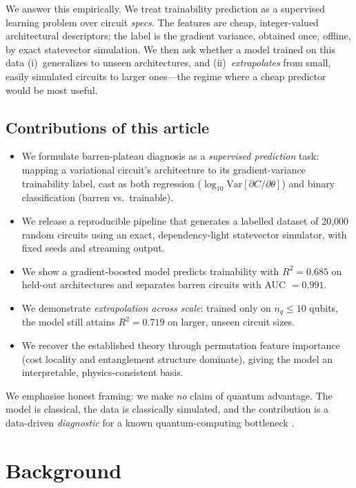 \documentclass[journal]{IEEEtran}
\newcommand{\Nrows}{20{,}000}                 %
\newcommand{\RsqHold}{0.685}
\newcommand{\AucHold}{0.991}
\newcommand{\ExtrapCut}{10}
\newcommand{\RsqExtrap}{0.719}
\begin{document}
We answer this empirically. We treat trainability prediction as a supervised
learning problem over circuit \emph{specs}. The features are cheap, integer-valued
architectural descriptors; the label is the gradient variance, obtained once,
offline, by exact statevector simulation. We then ask whether a model trained on
this data (i)~generalizes to unseen architectures, and (ii)~\emph{extrapolates}
from small, easily simulated circuits to larger ones---the regime where a cheap
predictor would be most useful.

\subsection*{Contributions of this article}
\begin{itemize}
\item We formulate barren-plateau diagnosis as a \emph{supervised prediction}
task: mapping a variational circuit's architecture to its gradient-variance
trainability label, cast as both regression ($\log_{10}\mathrm{Var}[\partial
C/\partial\theta]$) and binary classification (barren vs.\ trainable).
\item We release a reproducible pipeline that generates a labelled dataset of
\Nrows{} random circuits using an exact, dependency-light statevector simulator,
with fixed seeds and streaming output.
\item We show a gradient-boosted model predicts trainability with $R^2=\RsqHold{}$
on held-out architectures and separates barren circuits with AUC $=\AucHold{}$.
\item We demonstrate \emph{extrapolation across scale}: trained only on
$n_q\le\ExtrapCut{}$ qubits, the model still attains $R^2=\RsqExtrap{}$ on larger,
unseen circuit sizes.
\item We recover the established theory through permutation feature importance
(cost locality and entanglement structure dominate), giving the model an
interpretable, physics-consistent basis.
\end{itemize}

We emphasise honest framing: we make \emph{no} claim of quantum advantage. The
model is classical, the data is classically simulated, and the contribution is a
data-driven \emph{diagnostic} for a known quantum-computing bottleneck
\cite{schuld2022killoran,bowles2024benchmarking}.

\section{Background}
\end{document}
